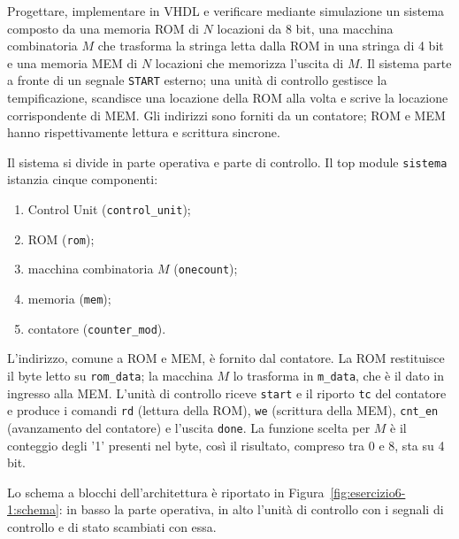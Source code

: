 \label{sec:esercizio6-1}

\begin{traccia}
Progettare, implementare in VHDL e verificare mediante simulazione un sistema composto da una memoria ROM di $N$ locazioni da 8 bit, una macchina combinatoria $M$ che trasforma la stringa letta dalla ROM in una stringa di 4 bit e una memoria MEM di $N$ locazioni che memorizza l'uscita di $M$. Il sistema parte a fronte di un segnale \texttt{START} esterno; una unità di controllo gestisce la tempificazione, scandisce una locazione della ROM alla volta e scrive la locazione corrispondente di MEM. Gli indirizzi sono forniti da un contatore; ROM e MEM hanno rispettivamente lettura e scrittura sincrone.
\end{traccia}


\progetto

Il sistema si divide in parte operativa e parte di controllo. Il top module \texttt{sistema} istanzia cinque componenti:
\begin{enumerate}
  \item Control Unit (\texttt{control\_unit});
  \item ROM (\texttt{rom});
  \item macchina combinatoria $M$ (\texttt{onecount});
  \item memoria (\texttt{mem});
  \item contatore (\texttt{counter\_mod}).
\end{enumerate}

L'indirizzo, comune a ROM e MEM, è fornito dal contatore. La ROM restituisce il byte letto su \texttt{rom\_data}; la macchina $M$ lo trasforma in \texttt{m\_data}, che è il dato in ingresso alla MEM. L'unità di controllo riceve \texttt{start} e il riporto \texttt{tc} del contatore e produce i comandi \texttt{rd} (lettura della ROM), \texttt{we} (scrittura della MEM), \texttt{cnt\_en} (avanzamento del contatore) e l'uscita \texttt{done}. La funzione scelta per $M$ è il conteggio degli '1' presenti nel byte, così il risultato, compreso tra 0 e 8, sta su 4 bit.

Lo schema a blocchi dell'architettura è riportato in Figura~\ref{fig:esercizio6-1:schema}: in basso la parte operativa, in alto l'unità di controllo con i segnali di controllo e di stato scambiati con essa.

